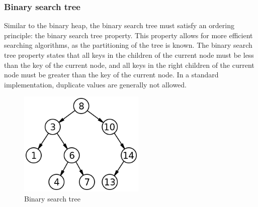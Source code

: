 \documentclass{article}
\begin{document}
\subsubsection{Binary search tree}
Similar to the binary heap, the binary search tree must satisfy an ordering principle: the binary search tree
property. This property allows for more efficient searching algorithms, as the partitioning of the tree is known.
The binary search tree property states that all keys in the children of the current node must be less than the key
of the current node, and all keys in the right children of the current node must be greater than the key of the
current node. In a standard implementation, duplicate values are generally not allowed.

\begin{figure}[H]
    \centering
    \includegraphics[width=6cm]{binary_search_tree}
    \caption{Binary search tree}
  \end{figure}
\end{document}
